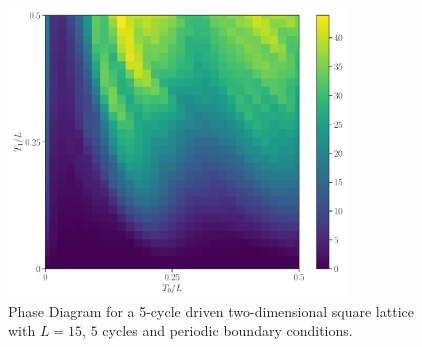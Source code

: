 \documentclass[11pt, a4paper]{article}
\theoremstyle{definition} %
\begin{document}
\begin{figure}[h]
	\centering
	\includegraphics[width=0.8\textwidth]{PhaseDiagram2D}
	\caption{Phase Diagram for a 5-cycle driven two-dimensional square lattice with $L=15$, $5$ cycles and periodic boundary conditions.}
\end{figure}
\end{document}
